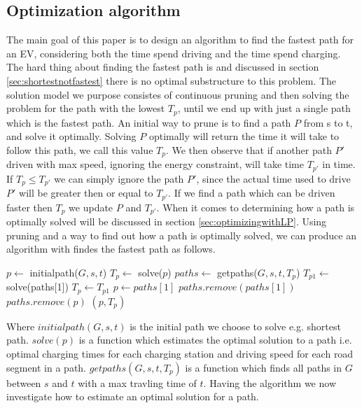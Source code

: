 \subsection{Optimization algorithm}
The main goal of this paper is to design an algorithm to find the fastest path for an EV, considering both the time spend driving and the time spend charging. The hard thing about finding the fastest path is and discussed in section \ref{sec:shortestnotfastest} there is no optimal substructure to this problem. The solution model we purpose consistes of continuous pruning and then solving the problem for the path with the lowest $T_p$, until we end up with just a single path which is the fastest path. An initial way to prune is to find a path $P$ from s to t, and solve it optimally. Solving $P$ optimally will return the time it will take to follow this path, we call this value $T_p$. We then observe that if another path $P'$ driven with max speed, ignoring the energy constraint, will take time $T_{p'}$ in time. If $T_p \leq T_{p'}$ we can simply ignore the path $P'$, since the actual time used to drive $P'$ will be greater then or equal to $T_{p'}$. If we find a path which can be driven faster then $T_p$ we update $P$ and $T_{p'}$. When it comes to determining how a path is optimally solved will be discussed in section \ref{sec:optimizingwithLP}. Using pruning and a way to find out how a path is optimally solved, we can produce an algorithm with findes the fastest path as follows. 
\begin{algorithmic}
    \State $p \gets$ initialpath($G,s,t$)
    \State $T_p \gets$ solve($p$)
    \State $paths \gets$ getpaths($G,s,t,T_p$)
    \Repeat 
    	\State $T_{p1} \gets$ solve(paths[1])
    		\State $T_p \gets T_{p1}$
    		\State $p \gets paths[1]$ 
    	\EndIf 
    	\State $paths.remove(paths[1])$
    			\State $paths.remove(p)$
    		\EndIf
    	\EndFor
    \State \Return $(p, T_p)$
\EndFunction
\end{algorithmic}
Where $initialpath(G,s,t)$ is the initial path we choose to solve e.g. shortest path. $solve(p)$ is a function which estimates the optimal solution to a path i.e. optimal charging times for each charging station and driving speed for each road segment in a path. $getpaths(G,s,t,T_p)$ is a function which finds all paths in $G$ between $s$ and $t$ with a max travling time of $t$. Having the algorithm we now investigate how to estimate an optimal solution for a path.     

